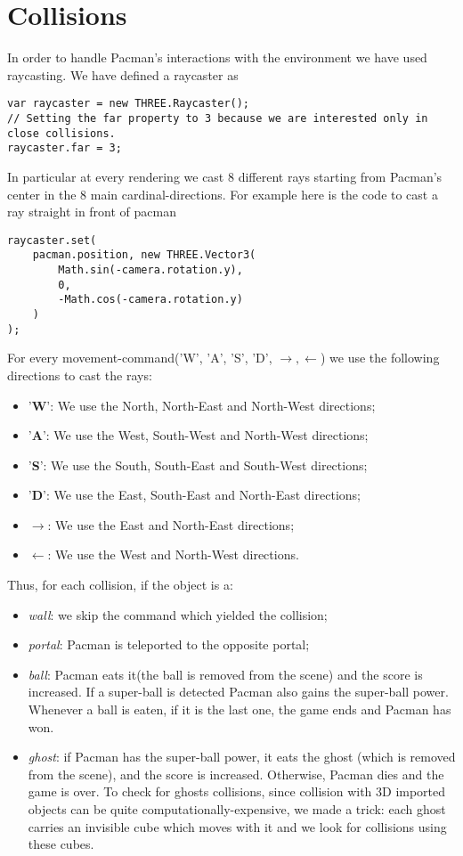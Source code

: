 \documentclass[a4paper,oneside]{report}
\begin{document}
\section{Collisions}
In order to handle Pacman's interactions with the environment we have used raycasting. 
We have defined a raycaster as
\begin{lstlisting}
var raycaster = new THREE.Raycaster();
// Setting the far property to 3 because we are interested only in close collisions.
raycaster.far = 3;
\end{lstlisting}
In particular at every rendering we cast 8 different rays starting from Pacman's center in the 8 main cardinal-directions. For example here is the code to cast a ray straight in front of pacman
\begin{lstlisting}
raycaster.set(
	pacman.position, new THREE.Vector3(
		Math.sin(-camera.rotation.y),
		0,
		-Math.cos(-camera.rotation.y)
	)
);
\end{lstlisting}
For every movement-command('W', 'A', 'S', 'D', $\rightarrow , \leftarrow$) we use the following directions to cast the rays:
\begin{itemize}
\item '\textbf{W}': We use the North, North-East and North-West directions;
\item '\textbf{A}': We use the West, South-West and North-West directions;
\item '\textbf{S}': We use the South, South-East and South-West directions;
\item '\textbf{D}': We use the East, South-East and North-East directions;
\item $\rightarrow$: We use the East and North-East directions;
\item $\leftarrow$: We use the West and North-West directions.
\end{itemize}

Thus, for each collision, if the object is a:
\begin{itemize}
\item \textit{wall}: we skip the command which yielded the collision;
\item \textit{portal}: Pacman is teleported to the opposite portal;
\item \textit{ball}: Pacman eats it(the ball is removed from the scene) and the score is increased. If a super-ball is detected Pacman also gains the super-ball power. Whenever a ball is eaten, if it is the last one, the game ends and Pacman has won.
\item \textit{ghost}: if Pacman has the super-ball power, it eats the ghost (which is removed from the scene), and the score is increased. Otherwise, Pacman dies and the game is over. To check for ghosts collisions, since collision with 3D imported objects can be quite computationally-expensive, we made a trick: each ghost carries an invisible cube which moves with it and we look for collisions using these cubes.
\end{itemize}
\end{document}
